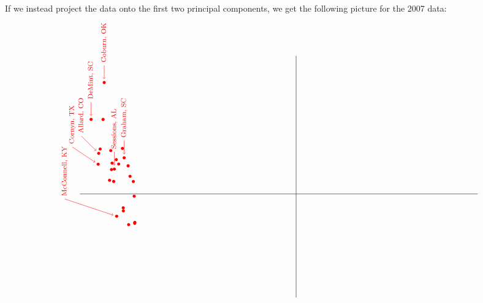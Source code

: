 If we instead project the data onto the first two principal
components, we get the following picture for the 2007 data:
\begin{equation*}
  \def\dataD#1#2#3#4#5#6#7{\fill[dem](#5,#6) circle (0.09);}
  \def\dataR#1#2#3#4#5#6#7{\fill[rep](#5,#6) circle (0.09);}
  \def\dataDx#1#2#3#4#5#6#7{\fill[dem](#5,#6) circle (0.09);
    \draw[dem,->,shorten >=0.15cm](#5,#6) +(#7,1) node[above] {\rotatebox{90}{\footnotesize #1, #4}} -- +(0,0);}
  \def\dataRx#1#2#3#4#5#6#7{\fill[rep](#5,#6) circle (0.09);
    \draw[rep,->,shorten >=0.15cm](#5,#6) +(#7,1) node[above] {\rotatebox{90}{\footnotesize #1, #4}} -- +(0,0);}
  \def\dataDy#1#2#3#4#5#6#7{\fill[dem](#5,#6) circle (0.09);
    \draw[dem,->,shorten >=0.15cm](#5,#6) +(#7,-1) node[below] {\rotatebox{90}{\footnotesize #1, #4}} -- +(0,0);}
  \def\dataRy#1#2#3#4#5#6#7{\fill[rep](#5,#6) circle (0.09);
    \draw[rep,->,shorten >=0.15cm](#5,#6) +(#7,-1) node[below] {\rotatebox{90}{\footnotesize #1, #4}} -- +(0,0);}
  \begin{tikzpicture}[scale=0.71]
    \draw (-12.5,0) -- (10.5,0);
    \draw (0,-6) -- (0,8);
    \dataRx{DeMint}{James}{R}{SC}{-11.856041}{4.315015}{0}
    \dataRx{Cornyn}{John}{R}{TX}{-11.446925}{1.720794}{-1.5}
    \dataRx{Allard}{A.}{R}{CO}{-11.414729}{2.353678}{-1}
    \dataR{Ensign}{John}{R}{NV}{-11.329050}{2.598885}{0}
    \dataR{Inhofe}{Jim}{R}{OK}{-11.161216}{4.313828}{0}
    \dataRx{Coburn}{Tom}{R}{OK}{-11.095925}{6.451745}{0}
    \dataR{Enzi}{Michael}{R}{WY}{-10.786882}{0.794427}{0}
    \dataR{Burr}{Richard}{R}{NC}{-10.716488}{2.508468}{0}
    \dataR{Bunning}{Jim}{R}{KY}{-10.674428}{1.409311}{0}
    \dataR{Chambliss}{Saxby}{R}{GA}{-10.639465}{1.781387}{0}
    \dataR{Isakson}{Johnny}{R}{GA}{-10.548229}{0.724451}{0}
    \dataRx{Sessions}{Jeff}{R}{AL}{-10.510782}{1.437248}{0}
    \dataR{Gregg}{Judd}{R}{NH}{-10.399051}{1.990574}{0}
    \dataRx{McConnell}{Mitch}{R}{KY}{-10.375319}{-1.293286}{-3}
    \dataR{Dole}{Elizabeth}{R}{NC}{-10.258572}{1.732827}{0}
    \dataR{Kyl}{Jon}{R}{AZ}{-10.042393}{2.633156}{0}
    \dataR{Craig}{Larry}{R}{ID}{-9.996687}{-0.803843}{0}
    \dataR{Crapo}{Mike}{R}{ID}{-9.987981}{-0.982945}{0}
    \dataRx{Graham}{Lindsey}{R}{SC}{-9.942743}{2.090629}{0}
    \dataR{Sununu}{John}{R}{NH}{-9.713036}{1.627775}{0}
    \dataR{Roberts}{Pat}{R}{KS}{-9.682832}{-1.781188}{0}
    \dataR{Martinez}{Mel}{R}{FL}{-9.602384}{1.021259}{0}
    \dataR{Thune}{John}{R}{SD}{-9.412180}{0.719407}{0}
    \dataR{Hutchison}{Kay}{R}{TX}{-9.362272}{-0.132493}{0}
    \dataR{Lott}{Trent}{R}{MS}{-9.333867}{-1.703358}{0}
    \dataR{Hatch}{Orrin}{R}{UT}{-9.325404}{-1.647643}{0}

\end{tikzpicture}
\end{equation*}
